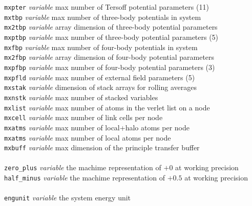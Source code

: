 \begin{tabbing}
\> {\tt mxpter}      \> {\em variable}     \> max number of Tersoff potential parameters (11) \\
\> {\tt mxtbp}       \> {\em variable}     \> max number of three-body potentials in system \\
\> {\tt mx2tbp}      \> {\em variable}     \> array dimension of three-body potential parameters \\
\> {\tt mxptbp}      \> {\em variable}     \> max number of three-body potential parameters (5) \\
\> {\tt mxfbp}       \> {\em variable}     \> max number of four-body potentials in system \\
\> {\tt mx2fbp}      \> {\em variable}     \> array dimension of four-body potential parameters \\
\> {\tt mxpfbp}      \> {\em variable}     \> max number of four-body potential parameters (3) \\
\> {\tt mxpfld}      \> {\em variable}     \> max number of external field parameters (5) \\
\> {\tt mxstak}      \> {\em variable}     \> dimension of stack arrays for rolling averages \\
\> {\tt mxnstk}      \> {\em variable}     \> max number of stacked variables \\
\> {\tt mxlist}      \> {\em variable}     \> max number of atoms in the verlet list on a node \\
\> {\tt mxcell}      \> {\em variable}     \> max number of link cells per node \\
\> {\tt mxatms}      \> {\em variable}     \> max number of local+halo atoms per node \\
\> {\tt mxatms}      \> {\em variable}     \> max number of local atoms per node \\
\> {\tt mxbuff}      \> {\em variable}     \> max dimension of the principle transfer buffer \\
\>                   \>                    \> \\
\> {\tt zero\_plus}  \> {\em variable}     \> the machime representation of $+0$ at working precision \\
\> {\tt half\_minus} \> {\em variable}     \> the machime representation of $+0.5$ at working precision \\
\>                   \>                    \> \\
\> {\tt engunit}     \> {\em variable}     \> the system energy unit \\
\end{tabbing}
